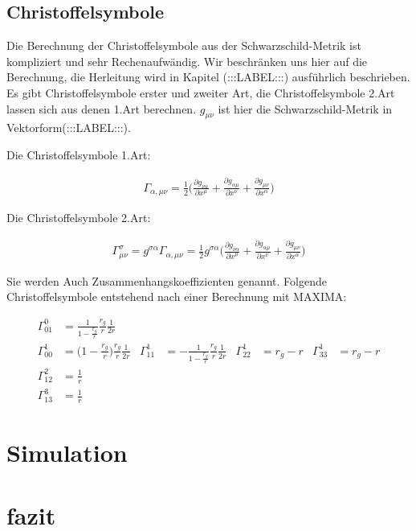 \begin{refsection}
	\subsection{Christoffelsymbole}
	
	Die Berechnung der Christoffelsymbole aus der Schwarzschild-Metrik ist kompliziert und sehr Rechenaufwändig. Wir beschränken uns hier auf die Berechnung, die Herleitung wird in Kapitel (:::LABEL:::) ausführlich beschrieben. Es gibt Christoffelsymbole erster und zweiter Art, die Christoffelsymbole 2.Art lassen sich aus denen 1.Art berechnen.
	$g_{\mu\nu}$ ist hier die Schwarzschild-Metrik in Vektorform(:::LABEL:::).
	
	Die Christoffelsymbole 1.Art:
	
	\begin{align*}
		\Gamma_{\alpha,\mu\nu} 
		= 
		\frac{1}{2}\biggl(\frac{\partial g_{\nu\alpha}}{\partial x^{\mu}} 
		+
		\frac{\partial g_{\alpha\mu}}{\partial x^{\nu}}
		+
		\frac{\partial g_{\mu\nu}}{\partial x^{\alpha}}
		 \biggr)
	\end{align*}
	
	Die Christoffelsymbole 2.Art:
	
	\begin{align*}
	\Gamma^{\sigma}_{\mu\nu} 
	= 
	g^{\sigma\alpha}\Gamma_{\alpha,\mu\nu} 
	=
	\frac{1}{2}g^{\sigma\alpha}\biggl(\frac{\partial g_{\nu\alpha}}{\partial x^{\mu}} 
	+
	\frac{\partial g_{\alpha\mu}}{\partial x^{\nu}}
	+
	\frac{\partial g_{\mu\nu}}{\partial x^{\alpha}}
	\biggr)
	\end{align*}
	
	Sie werden Auch Zusammenhangskoeffizienten genannt.
	Folgende Christoffelsymbole entstehend nach einer Berechnung mit MAXIMA:
	
	\begin{equation}
	\begin{aligned}
	\Gamma^0_{01}
	&=
	\frac{1}{1-\displaystyle\frac{r_g}{r}}
	\frac{r_g}{r}
	\frac{1}{2r}
	\\
	\Gamma^1_{00}
	&=
	\biggl(1-\displaystyle\frac{r_g}{r}\biggr)
	\frac{r_g}{r}
	\frac{1}{2r}
	&
	\Gamma^1_{11}
	&=
	-\frac1{1-\displaystyle\frac{r_g}{r}}
	\frac{r_g}{r}
	\frac{1}{2r}
	&
	\Gamma^1_{22}
	&=
	r_g-r
	&
	\Gamma^1_{33}
	&=
	r_g-r
	\\
	\Gamma^2_{12}
	&=
	\frac1r
	\\
	\Gamma^3_{13}
	&=
	\frac1r
	\end{aligned}
	\end{equation}
		
	\section{Simulation}
	
	
	\section{fazit}
	
	
	


	\printbibliography[heading=subbibliography]
	\end{refsection}

